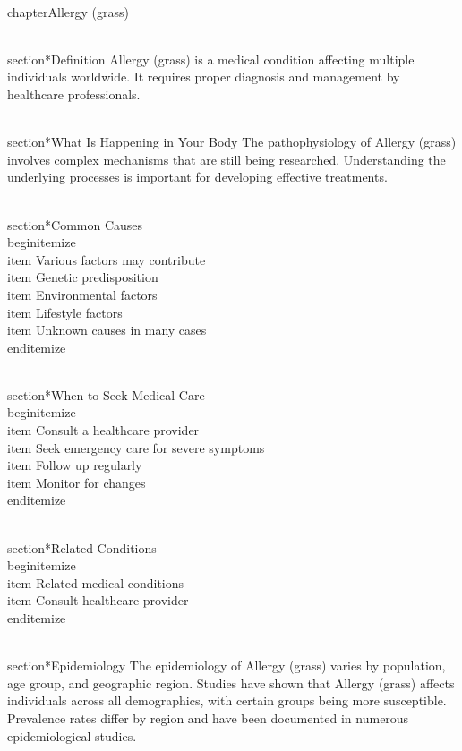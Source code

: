 
\\chapter{Allergy (grass)}

\\section*{Definition}
Allergy (grass) is a medical condition affecting multiple individuals worldwide. It requires proper diagnosis and management by healthcare professionals.

\\section*{What Is Happening in Your Body}
The pathophysiology of Allergy (grass) involves complex mechanisms that are still being researched. Understanding the underlying processes is important for developing effective treatments.

\\section*{Common Causes}
\\begin{itemize}
\\item Various factors may contribute\n  \\item Genetic predisposition\n  \\item Environmental factors\n  \\item Lifestyle factors\n  \\item Unknown causes in many cases
\\end{itemize}

\\section*{When to Seek Medical Care}
\\begin{itemize}
\\item Consult a healthcare provider\n  \\item Seek emergency care for severe symptoms\n  \\item Follow up regularly\n  \\item Monitor for changes
\\end{itemize}

\\section*{Related Conditions}
\\begin{itemize}
\\item Related medical conditions\n  \\item Consult healthcare provider
\\end{itemize}

\\section*{Epidemiology}
The epidemiology of Allergy (grass) varies by population, age group, and geographic region. Studies have shown that Allergy (grass) affects individuals across all demographics, with certain groups being more susceptible. Prevalence rates differ by region and have been documented in numerous epidemiological studies.

